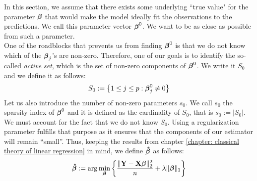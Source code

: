 In this section, we assume that there exists some underlying ``true value" for the parameter \(\boldsymbol{\beta}\) that would make the model ideally fit the observations to the predictions. We call this parameter vector \(\boldsymbol{\beta}^0\). We want to be as close as possible from such a parameter. \\
One of the roadblocks that prevents us from finding \(\boldsymbol{\beta}^0\) is that we do not know which of the \(\boldsymbol{\beta}_j\)'s are non-zero. Therefore, one of our goals is to identify the so-called \textit{active set}, which is the set of non-zero components of \(\boldsymbol{\beta}^0\). We write it \(S_0\) and we define it as follows:
\[
    S_0 := \left\{ 1 \leq j \leq p : \boldsymbol{\beta}_j^0 \neq 0 \right\}
\]
Let us also introduce the number of non-zero parameters \(s_0\). We call \(s_0\) the sparsity index of \(\boldsymbol{\beta}^0\) and it is defined as the cardinality of \(S_0\), that is \(s_0 := |S_0|\). \\
We must account for the fact that we do not know \(S_0\). Using a regularization parameter fulfills that purpose as it ensures that the components of our estimator will remain ``small''. Thus, keeping the results from chapter \ref{chapter: classical theory of linear regression} in mind, we define $\boldsymbol{\hat{\beta}}$ as follows:
\begin{equation}
    \label{eqn: beta hat (LASSO)}
    \boldsymbol{\hat{\beta}}:=\arg \min _{\boldsymbol{\beta}}\left\{ \frac{\|\mathbf{Y}-\mathbf{X} \boldsymbol{\beta}\|_{2}^{2}}{n}+\lambda\|\boldsymbol{\beta}\|_{1} \right\}
\end{equation}

